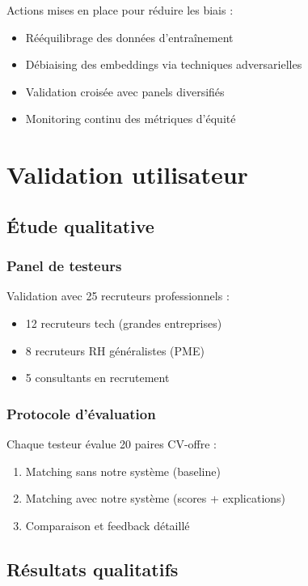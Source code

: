 \documentclass[12pt,a4paper]{report}
\begin{document}
Actions mises en place pour réduire les biais :
\begin{itemize}
\item Rééquilibrage des données d'entraînement
\item Débiaising des embeddings via techniques adversarielles
\item Validation croisée avec panels diversifiés
\item Monitoring continu des métriques d'équité
\end{itemize}

\section{Validation utilisateur}

\subsection{Étude qualitative}

\subsubsection{Panel de testeurs}

Validation avec 25 recruteurs professionnels :
\begin{itemize}
\item 12 recruteurs tech (grandes entreprises)
\item 8 recruteurs RH généralistes (PME)
\item 5 consultants en recrutement
\end{itemize}

\subsubsection{Protocole d'évaluation}

Chaque testeur évalue 20 paires CV-offre :
\begin{enumerate}
\item Matching sans notre système (baseline)
\item Matching avec notre système (scores + explications)
\item Comparaison et feedback détaillé
\end{enumerate}

\subsection{Résultats qualitatifs}
\end{document}
